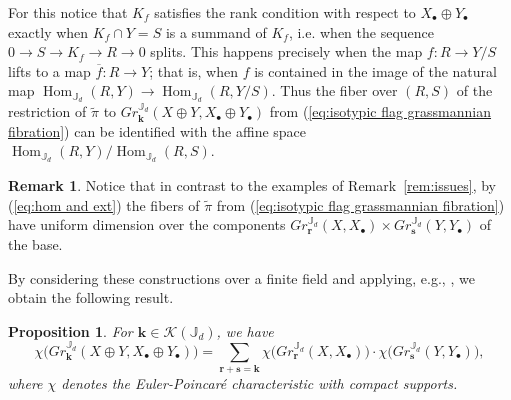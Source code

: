 \documentclass{amsart}
\numberwithin{equation}{section}
\newtheorem{proposition}[theorem]{Proposition}
\theoremstyle{definition}
\newtheorem{remark}[theorem]{Remark}
\def\FF{\mathbb{F}}
\def\JJ{\mathbb{J}}
\def\bfk{\mathbf{k}}
\def\bfr{\mathbf{r}}
\def\bfs{\mathbf{s}}
\def\cK{\mathcal{K}}
\def\Hom{\operatorname{Hom}}
\renewcommand{\eqref}[1]{{\rm (\ref{#1})}}
\newcommand{\erase}[1]{{}}
\begin{document}
For this notice that $K_f$ satisfies the rank condition with respect to $X_\bullet\oplus Y_\bullet$ exactly when $K_f\cap Y=S$ is a summand of $K_f$, i.e. when the sequence $0\to S\to K_f\to R\to 0$ splits.  This happens precisely when the map $f:R\to Y/S$ lifts to a map $\overline{f}:R\to Y$; that is, when $f$ is contained in the image of the natural map $\Hom_{\JJ_d}(R,Y)\to\Hom_{\JJ_d}(R,Y/S)$.  Thus the fiber over $(R,S)$ of the restriction of $\tilde\pi$ to $Gr_\bfk^{\JJ_d}(X\oplus Y,X_\bullet\oplus Y_\bullet)$ from \eqref{eq:isotypic flag grassmannian fibration} can be identified with the affine space $\Hom_{\JJ_d}(R,Y)/\Hom_{\JJ_d}(R,S)$.
\begin{remark}
  Notice that in contrast to the examples of Remark~\ref{rem:issues}, by \eqref{eq:hom and ext} the fibers of $\tilde\pi$ from \eqref{eq:isotypic flag grassmannian fibration} have uniform dimension over the components $Gr_\bfr^{\JJ_d}(X,X_\bullet)\times Gr_\bfs^{\JJ_d}(Y,Y_\bullet)$ of the base. 
\end{remark}

By considering these constructions over a finite field and applying, e.g., \cite[Lemma 3.5]{caldero-chapoton}, we obtain the following result.
\begin{proposition}\label{prop:flag grassmannian recursion}
  For $\bfk\in\cK(\JJ_d)$, we have
  \[\chi\big(Gr_\bfk^{\JJ_d}(X\oplus Y,X_\bullet\oplus Y_\bullet)\big)=\sum\limits_{\bfr+\bfs=\bfk}\chi\big(Gr_\bfr^{\JJ_d}(X,X_\bullet)\big)\cdot\chi\big(Gr_\bfs^{\JJ_d}(Y,Y_\bullet)\big),\]
  where $\chi$ denotes the Euler-Poincar\'e characteristic with compact supports.
\end{proposition}

\erase{
Working again over the finite field $\FF=\FF_q$ with $q$ elements, we obtain a precise recursion on the point count of $Gr_\bfk^{\JJ_d}(X_\bullet\oplus Y_\bullet)$.
\begin{proposition}
  Let $X$ and $Y$ be $\JJ_d$-modules together with flags $X_\bullet$ and $Y_\bullet$ of $\JJ_d$-submodules.  For $\bfk\in\cK(\JJ_d)$ we have
  \[\big|Gr_\bfk^{\JJ_d}(X_\bullet\oplus Y_\bullet)\big|=\sum\limits_{\bfr+\bfs=\bfk}q^{\sum\limits_{1\le i,j\le d}\min(i,j)r_i(y_j-s_j)}\big|Gr_\bfr^{\JJ_d}(X_\bullet)\big|\cdot\big|Gr_\bfs^{\JJ_d}(Y_\bullet)\big|,\]
  where we write $[Y]=y_1\beta_1+\cdots+y_d\beta_d$.
\end{proposition}}%
\end{document}

